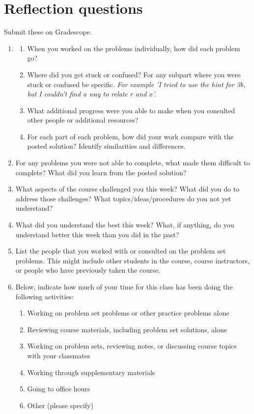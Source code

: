 \documentclass[12pt,letterpaper]{exam}
\begin{document}



\section*{Reflection questions}
Submit these on Gradescope.
\begin{enumerate}
\item \begin{enumerate}
    \itemsep0pt
    \item When you worked on the problems individually, how did each problem go?
    \item Where did you get stuck or confused?  For any subpart where you were stuck or confused be specific.  \emph{For example 'I tried to use the hint for 3b, but I couldn't find a way to relate $r$ and $x$'.}
    \item What additional progress were you able to make when you consulted other people or additional resources?
    \item For each part of each problem, how did your work compare with the posted solution?  Identify similarities and differences.
\end{enumerate}  
\item For any problems you were not able to complete, what made them difficult to complete?  What did you learn from the posted solution?
\item What aspects of the course challenged you this week?  What did you do to address those challenges?  What topics/ideas/procedures do you not yet understand?
\item What did you understand the best this week?  What, if anything, do you understand better this week than you did in the past?
\item List the people that you worked with or consulted on the problem set problems.  This might include other students in the course, course instructors, or people who have previously taken the course.
\item Below, indicate how much of your time for this class has been doing the following activities:
	\begin{enumerate}
	\item Working on problem set problems or other practice problems alone
	\item Reviewing course materials, including problem set solutions, alone
	\item Working on problem sets, reviewing notes, or discussing course topics with your classmates
	\item Working through supplementary materials
	\item Going to office hours
	\item Other (please specify)
	\end{enumerate}

\end{enumerate}
\end{document}
